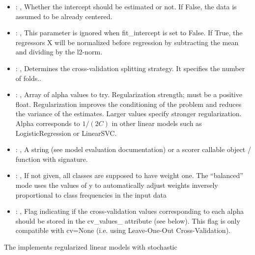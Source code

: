 \begin{itemize}
    \item {}: , 
      Whether the intercept should be estimated or not. If False,
      the data is assumed to be already centered.

    \item {}: , 
      This parameter is ignored when fit\_intercept is set to False. If True, the
      regressors X will be normalized before regression by subtracting the mean and dividing
      by the l2-norm.

    \item {}: , 
      Determines the cross-validation splitting strategy.
      It specifies the number of folds..

    \item {}: , 
      Array of alpha values to try. Regularization strength; must be a positive float.
      Regularization                                                  improves the conditioning of
      the problem and reduces the variance of the estimates.
      Larger values specify stronger regularization. Alpha corresponds to $1 / (2C)$ in other
      linear models such as LogisticRegression or LinearSVC.

    \item {}: , 
      A string (see model evaluation documentation) or a scorer
      callable object / function with signature.

    \item {}: \xmlDesc{[balanced]}, 
      If not given, all classes are supposed to have weight one.
      The “balanced” mode uses the values of y to automatically adjust weights
      inversely proportional to class frequencies in the input data

    \item {}: , 
      Flag indicating if the cross-validation values corresponding
      to each alpha should be stored in the cv\_values\_ attribute (see below).
      This flag is only compatible with cv=None (i.e. using Leave-One-Out
      Cross-Validation).
  \end{itemize}
 The  implements regularized linear models with stochastic
